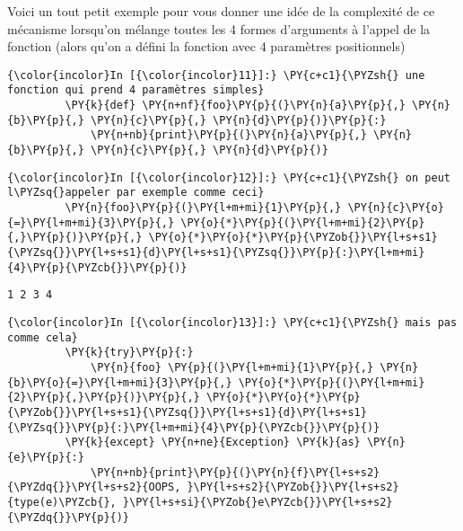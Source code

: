     Voici un tout petit exemple pour vous donner une idée de la complexité
de ce mécanisme lorsqu'on mélange toutes les 4 formes d'arguments à
l'appel de la fonction (alors qu'on a défini la fonction avec 4
paramètres positionnels)

    \begin{Verbatim}[commandchars=\\\{\},frame=single,framerule=0.3mm,rulecolor=\color{cellframecolor}]
{\color{incolor}In [{\color{incolor}11}]:} \PY{c+c1}{\PYZsh{} une fonction qui prend 4 paramètres simples}
         \PY{k}{def} \PY{n+nf}{foo}\PY{p}{(}\PY{n}{a}\PY{p}{,} \PY{n}{b}\PY{p}{,} \PY{n}{c}\PY{p}{,} \PY{n}{d}\PY{p}{)}\PY{p}{:}
             \PY{n+nb}{print}\PY{p}{(}\PY{n}{a}\PY{p}{,} \PY{n}{b}\PY{p}{,} \PY{n}{c}\PY{p}{,} \PY{n}{d}\PY{p}{)}
\end{Verbatim}


    \begin{Verbatim}[commandchars=\\\{\},frame=single,framerule=0.3mm,rulecolor=\color{cellframecolor}]
{\color{incolor}In [{\color{incolor}12}]:} \PY{c+c1}{\PYZsh{} on peut l\PYZsq{}appeler par exemple comme ceci}
         \PY{n}{foo}\PY{p}{(}\PY{l+m+mi}{1}\PY{p}{,} \PY{n}{c}\PY{o}{=}\PY{l+m+mi}{3}\PY{p}{,} \PY{o}{*}\PY{p}{(}\PY{l+m+mi}{2}\PY{p}{,}\PY{p}{)}\PY{p}{,} \PY{o}{*}\PY{o}{*}\PY{p}{\PYZob{}}\PY{l+s+s1}{\PYZsq{}}\PY{l+s+s1}{d}\PY{l+s+s1}{\PYZsq{}}\PY{p}{:}\PY{l+m+mi}{4}\PY{p}{\PYZcb{}}\PY{p}{)}
\end{Verbatim}


    \begin{Verbatim}[commandchars=\\\{\},frame=single,framerule=0.3mm,rulecolor=\color{cellframecolor}]
1 2 3 4
\end{Verbatim}

    \begin{Verbatim}[commandchars=\\\{\},frame=single,framerule=0.3mm,rulecolor=\color{cellframecolor}]
{\color{incolor}In [{\color{incolor}13}]:} \PY{c+c1}{\PYZsh{} mais pas comme cela}
         \PY{k}{try}\PY{p}{:}
             \PY{n}{foo} \PY{p}{(}\PY{l+m+mi}{1}\PY{p}{,} \PY{n}{b}\PY{o}{=}\PY{l+m+mi}{3}\PY{p}{,} \PY{o}{*}\PY{p}{(}\PY{l+m+mi}{2}\PY{p}{,}\PY{p}{)}\PY{p}{,} \PY{o}{*}\PY{o}{*}\PY{p}{\PYZob{}}\PY{l+s+s1}{\PYZsq{}}\PY{l+s+s1}{d}\PY{l+s+s1}{\PYZsq{}}\PY{p}{:}\PY{l+m+mi}{4}\PY{p}{\PYZcb{}}\PY{p}{)}
         \PY{k}{except} \PY{n+ne}{Exception} \PY{k}{as} \PY{n}{e}\PY{p}{:}
             \PY{n+nb}{print}\PY{p}{(}\PY{n}{f}\PY{l+s+s2}{\PYZdq{}}\PY{l+s+s2}{OOPS, }\PY{l+s+s2}{\PYZob{}}\PY{l+s+s2}{type(e)\PYZcb{}, }\PY{l+s+si}{\PYZob{}e\PYZcb{}}\PY{l+s+s2}{\PYZdq{}}\PY{p}{)}
\end{Verbatim}


